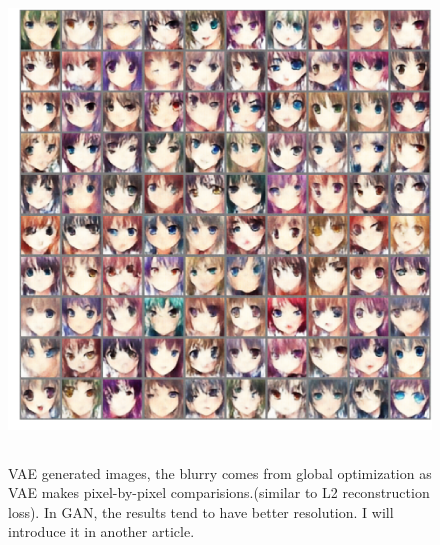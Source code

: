 \documentclass{article}
\begin{document}
\begin{figure}[H]
\centering
\includegraphics[width=5in,height=5in]{result1}
\caption{VAE generated images, the blurry comes from global optimization as VAE makes pixel-by-pixel comparisions.(similar to L2 reconstruction loss). In GAN, the results tend to have better resolution. I will introduce it in another article.}
\end{figure}



\end{document}
